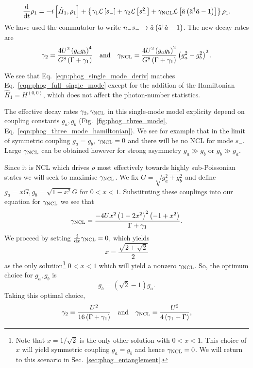 \begin{equation}\label{eqn:phog_single_mode_deriv}
\frac{\mathrm{d}}{\mathrm{d}t} \rho_1 = - i \left[\hat{H}_1, \rho_1\right] + \left\{\gamma_1 \mathcal{L}\left[s_-\right] + \gamma_2 \mathcal{L}\left[s_-^2\right] + \gamma_{\text{NCL}} \mathcal{L}\left[\hat{a}\left(\hat{a}^\dagger \hat{a} - 1\right)\right] \right\}\rho_1.
\end{equation}
We have used the commutator to write $n_- s_- \rightarrow \hat{a}\left(\hat{a}^\dagger \hat{a} - 1\right)$. The new decay rates are
\begin{equation}\label{eqn:phog_single_mode_decay_rates}
\gamma_2 = \frac{4 U^2 \left(g_a g_b\right)^4}{G^8 \left(\Gamma + \gamma_1\right)} \qq{and} \gncl = \frac{4 U^2 \left(g_a g_b\right)^2}{G^8 \left(\Gamma + \gamma_1\right)}\left(g_a^2 - g_b^2\right)^2.
\end{equation}

\noindent We see that Eq.~\ref{eqn:phog_single_mode_deriv} matches Eq.~\ref{eqn:phog_full_single_mode} except for the addition of the Hamiltonian $\hat{H}_1 = H^{\left(0, 0\right)}$, which does not affect the photon-number statistics. 



The effective decay rates $\gamma_2, \gamma_{\text{NCL}}$ in this single-mode model explicity depend on coupling constants $g_a, g_b$ (Fig.~\ref{fig:phog_three_mode}, Eq.~\ref{eqn:phog_three_mode_hamiltonian}). We see for example that in the limit of symmetric coupling $g_a = g_b$, $\gamma_{\text{NCL}} = 0$ and there will be no NCL for mode $s_-$. Large $\gamma_{\text{NCL}}$ can be obtained however for strong asymmetry $g_a \gg g_b$ or $g_b \gg g_a$. 

Since it is NCL which drives $\rho$ most effectively towards highly sub-Poissonian states we will seek to maximise $\gamma_{\text{NCL}}$. We fix $G = \sqrt{g_a^2 + g_b^2}$ and define $g_a = x G, g_b = \sqrt{1-x^2}G$ for $0 < x < 1$. Substituting these couplings into our equation for $\gamma_{\text{NCL}}$ we see that
\begin{equation}
\gamma_{\text{NCL}} = \frac{- 4 U x^2 \left(1 - 2 x^2\right)^2 \left(-1 + x^2\right)}{\Gamma + \gamma_1}.
\end{equation}
We proceed by setting $\frac{\mathrm{d}}{\mathrm{d}x} \gamma_{\text{NCL}} = 0$, which yields
\begin{equation}
x = \frac{\sqrt{2 + \sqrt{2}}}{2}
\end{equation}
as the only solution\footnote{Note that $x = 1/\sqrt{2}$ is the only other solution with $0 < x < 1$. This choice of $x$ will yield symmetric coupling $g_a = g_b$ and hence $\gamma_{\text{NCL}}=0$. We will return to this scenario in Sec.~\ref{sec:phog_entanglement}.} $0 < x < 1$ which will yield a nonzero $\gamma_{\text{NCL}}$. So, the optimum choice for $g_a, g_b$ is
\begin{equation}\label{eqn:phog_gagb_optimal}
g_b = \left(\sqrt{2} - 1\right)g_a.
\end{equation}
Taking this optimal choice,
\begin{equation}\label{eqn:phog_gamma3_optimal}
\gamma_2 = \frac{U^2}{16\left(\Gamma + \gamma_1\right)} \qq{and} \gncl = \frac{U^2}{4 \left(\gamma_1 + \Gamma\right)},
\end{equation}

